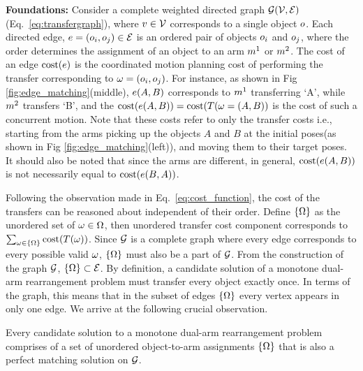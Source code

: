 \noindent\textbf{Foundations:} Consider a complete weighted directed graph $\mathcal{G}(\mathcal{V},\mathcal{E})$ (Eq.~\ref{eq:transfergraph}), where ${v} \in \mathcal{V}$ corresponds to a single object $ o $. Each directed edge, ${e}=(o_i,o_j) \in \mathcal{E}$ is an ordered pair of objects $ o_i $ and $o_j $, where the order determines the assignment of an object to an arm $ m^1 $ or $ m^2 $. The cost of an edge $ \textup{cost}({e}) $ is the coordinated motion planning cost of performing the transfer corresponding to $ {\omega} = (o_i,o_j) $. For instance, as shown in Fig \ref{fig:edge_matching}(middle), ${e}(A,B)$ corresponds to $ m^1 $ transferring `A', while $ m^2 $ transfers `B', and the $\textup{cost}( {e}(A,B) ) = \textup{cost}(T({\omega}=(A,B))$ is the cost of such a concurrent motion. Note that these costs refer to only the transfer costs i.e., starting from the arms picking up the objects $ A $ and $ B $ at the initial poses(as shown in Fig \ref{fig:edge_matching}(left)), and moving them to their target poses. It should also be noted that since the arms are different, in general, $\textup{cost}( {e}(A,B) )$ is not necessarily equal to $\textup{cost}( {e}(B,A) )$.



Following the observation made in Eq.~\ref{eq:cost_function}, the cost of the transfers can be reasoned about independent of their order. 
Define $\{{{\Omega}}\}$ as the unordered set of ${\omega}\in{{\Omega}}$, then unordered transfer cost component corresponds to $\sum_{{\omega}\in\{{{\Omega}}\}}\textup{cost}(T({\omega}))$.
Since $ \mathcal{G} $ is a complete graph where every edge corresponds to every possible valid $ {\omega} $, $ \{{{\Omega}}\} $ must also be a part of $ \mathcal{G} $. 
From the construction of the graph $ \mathcal{G} $, $ \{{{\Omega}}\} \subset \mathcal{E}$. By definition, a candidate solution of a monotone dual-arm rearrangement problem must transfer every object exactly once. In terms of the graph, this means that in the subset of edges $ \{{{\Omega}}\} $ every vertex appears in only one edge. We arrive at the following crucial observation.



{
Every candidate solution to a monotone dual-arm rearrangement problem comprises of a set of unordered object-to-arm assignments $ \{{{\Omega}}\} $ that is also a perfect matching solution on $ \mathcal{G} $.
}

